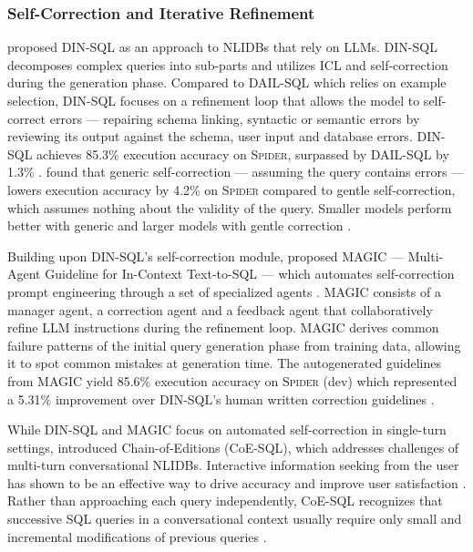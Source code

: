 \subsubsection{Self-Correction and Iterative Refinement}

\cite{DINSQL} proposed DIN-SQL as an approach to NLIDBs that rely on LLMs.
DIN-SQL decomposes complex queries into sub-parts and utilizes ICL and
self-correction during the generation phase. Compared to DAIL-SQL which relies
on example selection, DIN-SQL focuses on a refinement loop that allows the
model to self-correct errors — repairing schema linking, syntactic or semantic
errors by reviewing its output against the schema, user input and database
errors. DIN-SQL achieves 85.3\% execution accuracy on \textsc{Spider},
surpassed by DAIL-SQL by 1.3\% \citep{DINSQL, DAIL-SQL}. \citeauthor{DINSQL}
found that generic self-correction — assuming the query contains errors — lowers
execution accuracy by 4.2\% on \textsc{Spider} compared to gentle
self-correction, which assumes nothing about the validity of the query. Smaller
models perform better with generic and larger models with gentle correction
\citep{DINSQL}.

Building upon DIN-SQL's self-correction module, \cite{MAGIC} proposed MAGIC —
Multi-Agent Guideline for In-Context Text-to-SQL — which automates
self-correction prompt engineering through a set of specialized agents
\citep{MAGIC}. MAGIC consists of a manager agent, a correction agent and a
feedback agent that collaboratively refine LLM instructions during the
refinement loop. MAGIC derives common failure patterns of the initial query
generation phase from training data, allowing it to spot common mistakes at
generation time. The autogenerated guidelines from MAGIC yield 85.6\% execution
accuracy on \textsc{Spider} (dev) which represented a 5.31\% improvement over
DIN-SQL's human written correction guidelines \citep{MAGIC}.

While DIN-SQL and MAGIC focus on automated self-correction in single-turn
settings, \cite{CoE-SQL} introduced Chain-of-Editions (CoE-SQL), which
addresses challenges of multi-turn conversational NLIDBs. Interactive
information seeking from the user has shown to be an effective way to drive
accuracy and improve user satisfaction \citep{NALIR}. Rather than approaching
each query independently, CoE-SQL recognizes that successive SQL queries in a
conversational context usually require only small and incremental modifications
of previous queries \citep{CoE-SQL, UnnaturalQueryLanguage, NALIR}.

